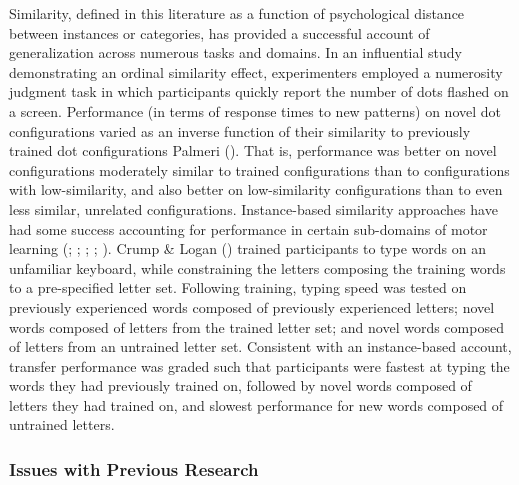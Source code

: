 \documentclass[
  11pt,
  letterpaper,
]{article}
\begin{document}
Similarity, defined in this literature as a function of psychological
distance between instances or categories, has provided a successful
account of generalization across numerous tasks and domains. In an
influential study demonstrating an ordinal similarity effect,
experimenters employed a numerosity judgment task in which participants
quickly report the number of dots flashed on a screen. Performance (in
terms of response times to new patterns) on novel dot configurations
varied as an inverse function of their similarity to previously trained
dot configurations Palmeri
(). That
is, performance was better on novel configurations moderately similar to
trained configurations than to configurations with low-similarity, and
also better on low-similarity configurations than to even less similar,
unrelated configurations. Instance-based similarity approaches have had
some success accounting for performance in certain sub-domains of motor
learning (;
; ; ; ). Crump \& Logan
() trained
participants to type words on an unfamiliar keyboard, while constraining
the letters composing the training words to a pre-specified letter set.
Following training, typing speed was tested on previously experienced
words composed of previously experienced letters; novel words composed
of letters from the trained letter set; and novel words composed of
letters from an untrained letter set. Consistent with an instance-based
account, transfer performance was graded such that participants were
fastest at typing the words they had previously trained on, followed by
novel words composed of letters they had trained on, and slowest
performance for new words composed of untrained letters.

\subsubsection{Issues with Previous
Research}\label{issues-with-previous-research}
\end{document}
